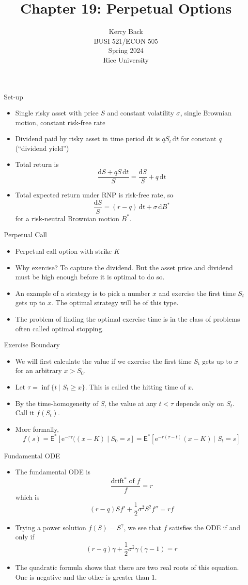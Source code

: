 \documentclass[10pt]{beamer}
\title{Chapter 19: Perpetual Options}
\date{}
\author{Kerry Back\\ 
BUSI 521/ECON 505\\
Spring 2024\\
Rice University}
\newcommand{\bi}{\begin{itemize}}
\newcommand{\ei}{\end{itemize}}
\newcommand{\im}{\item}
\newcommand{\D}{\mathrm{d}}
\newcommand{\E}{\mathrm{e}}
\newcommand{\mye}{\ensuremath{\mathsf{E}}}
\begin{document}
\maketitle


\begin{frame}{Set-up}
    \bi 
      \im Single risky asset with price $S$ and constant volatility $\sigma$, single Brownian motion, constant risk-free rate
    
      \im Dividend paid by risky asset in time period $\D t$ is $qS_t\,\D t$ for constant $q$ (``dividend yield'')
    
      \im Total return is
    $$\frac{\D S + qS\,\D t}{S} = \frac{\D S}{S} + q\,\D t$$
    \im Total expected return under RNP is risk-free rate, so
    $$\frac{\D S}{S} = (r-q)\,\D t + \sigma\,\D B^*$$
    for a risk-neutral Brownian motion $B^*$.
    \ei
 \end{frame}
 

 \begin{frame}{Perpetual Call} 
    \bi \im
 Perpetual call option with strike $K$
 
 \im Why exercise?  To capture the dividend.  But the asset price and dividend must be high enough before it is optimal to do so.
 
 \im An example of a strategy is to pick a number $x$ and exercise the first time $S_t$ gets up to $x$.  The optimal strategy will be of this type.
 
 \im The problem of finding the optimal exercise time is in the class of problems often called optimal stopping.
 \ei 
 \end{frame}
 
 \begin{frame}{Exercise Boundary}
    \bi \im
 We will first calculate the value if we exercise the first time $S_t$ gets up to $x$ for an arbitrary $x>S_0$.
 
 \im  Let $\tau = \inf\{t \mid S_t \ge x\}$.  This is called the hitting time of $x$.
 
 \im By the time-homogeneity of $S$, the value at any $t<\tau$ depends only on $S_t$.  Call it $f(S_t)$.  
     
 \im    More formally,
     $$f(s) = \mye^*[\E^{-r\tau}((x-K) \mid S_0=s] = \mye^*[\E^{-r(\tau-t)} (x-K)\mid S_t=s]$$
     \ei 
 \end{frame}
 \begin{frame}{Fundamental ODE}
     \bi \im 
     The fundamental ODE is 
     $$\frac{\text{drift$^*$ of $f$}}{f} = r$$
     which is
     $$(r-q)Sf' + \frac{1}{2}\sigma^2S^2f'' = rf$$
     \im Trying a power solution $f(S) = S^\gamma$, we see that $f$ satisfies the ODE if and only if
     $$(r-q)\gamma + \frac{1}{2}\sigma^2\gamma(\gamma-1) = r$$
     \im The quadratic formula shows that there are two real roots of this equation.  One is negative and the other is greater than 1.  
     \ei
     
 
 \end{frame}
     
\end{document}
